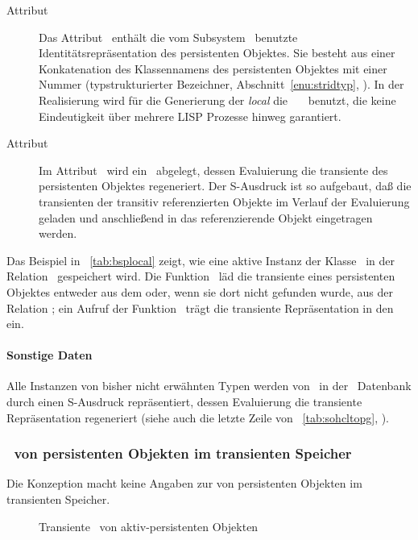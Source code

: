 \begin{description}
%
\item[Attribut \protect{}]
Das Attribut \ enth\"{a}lt die vom
Subsystem \store\ benutzte Identit\"{a}tsrepr\"{a}sentation des persistenten
Objektes. Sie besteht aus einer Konkatenation des Klassennamens des
persistenten Objektes mit einer Nummer (typstrukturierter
Bezeichner, Abschnitt~\ref{enu:stridtyp},
\citepage{\pageref{enu:stridtyp}}). In der Realisierung
wird f\"{u}r die Generierung der {\em local} \objid\/ die
\fn\ \ \ benutzt, die keine Eindeutigkeit
\"{u}ber mehrere LISP Prozesse hinweg garantiert.
%
\item[Attribut \protect{}]
Im Attribut \ wird ein
\ abgelegt, dessen
Evaluierung die transiente \representation{} des persistenten Objektes
regeneriert. Der S-Ausdruck ist so aufgebaut, da\ss{} die transienten
\representations{} der transitiv referenzierten Objekte im Verlauf der
Evaluierung geladen und anschlie\ss{}end in das referenzierende Objekt
eingetragen werden.
%
\end{description}
%
Das Beispiel in \tablename~\ref{tab:bsplocal} %
%
zeigt, wie eine aktive Instanz der Klasse \ in der Relation
\ gespeichert wird. Die Funktion
\ l\"{a}d die transiente \representation{} eines
persistenten Objektes entweder aus dem \cache\/ oder, wenn sie dort nicht
gefunden wurde, aus der Relation ; ein Aufruf der
Funktion \ tr\"{a}gt die transiente Repr\"{a}sentation
in den \cache\/ ein.
%
\paragraph{Sonstige Daten}
%
Alle Instanzen von bisher nicht erw\"{a}hnten Typen werden von
\soh\ in der \postgres\ Datenbank durch einen S-Ausdruck
repr\"{a}sentiert, dessen Evaluierung die transiente Repr\"{a}sentation
regeneriert (siehe auch die letzte Zeile von
\tablename~\ref{tab:sohcltopg}, \citepage{\pageref{tab:sohcltopg}}).
%
\subsubsection{\protect\representation\ von persistenten Objekten im transienten
Speicher}
%
Die Konzeption macht keine Angaben zur \representation{} von
persistenten Objekten im transienten Speicher.
%
\ifbuch%
\begin{figure}[htbp]%
\centerline{}%
\caption{Transiente \protect\representation\ von aktiv-persistenten Objekten}%
\label{fig:clolout}%
\end{figure}%
\fi%
%

